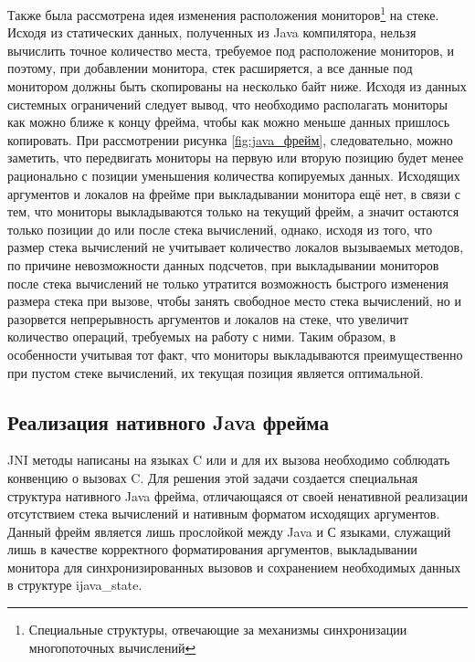 Также была рассмотрена идея изменения расположения мониторов\footnote{Специальные структуры, отвечающие за механизмы синхронизации многопоточных вычислений} на стеке. Исходя из статических данных, полученных из Java компилятора, нельзя вычислить точное количество места, требуемое под расположение мониторов, и поэтому, при добавлении монитора, стек расширяется, а все данные под монитором должны быть скопированы на несколько байт ниже. Исходя из данных системных ограничений следует вывод, что необходимо располагать мониторы как можно ближе к концу фрейма, чтобы как можно меньше данных пришлось копировать. При рассмотрении рисунка \ref{fig:java_фрейм}, следовательно, можно заметить, что передвигать мониторы на первую или вторую позицию будет менее рационально с позиции уменьшения количества копируемых данных. Исходящих аргументов и локалов на фрейме при выкладывании монитора ещё нет, в связи с тем, что мониторы выкладываются только на текущий фрейм, а значит остаются только позиции до или после стека вычислений, однако, исходя из того, что размер стека вычислений не учитывает количество локалов вызываемых методов, по причине невозможности данных подсчетов, при выкладывании мониторов после стека вычислений не только утратится возможность быстрого изменения размера стека при вызове, чтобы занять свободное место стека вычислений, но и разорвется непрерывность аргументов и локалов на стеке, что увеличит количество операций, требуемых на работу с ними. Таким образом, в особенности учитывая тот факт, что мониторы выкладываются преимущественно при пустом стеке вычислений, их текущая позиция является оптимальной.



\subsection{Реализация нативного Java фрейма}
JNI методы написаны на языках C или \cpp и для их вызова необходимо соблюдать конвенцию о вызовах C. Для решения этой задачи создается специальная структура нативного Java фрейма, отличающаяся от своей ненативной реализации отсутствием стека вычислений и нативным форматом исходящих аргументов. Данный фрейм является лишь прослойкой между Java и С языками, служащий лишь в качестве корректного форматирования аргументов, выкладывании монитора для синхронизированных вызовов и сохранением необходимых данных в структуре ijava\_state.




